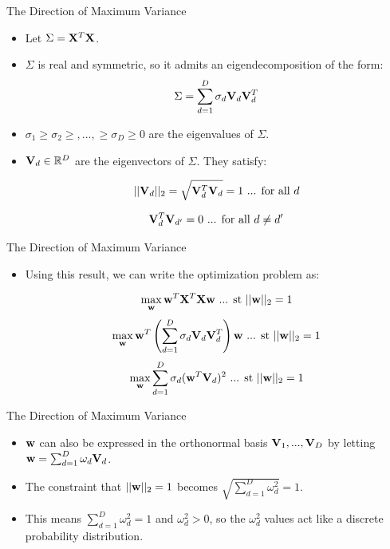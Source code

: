 \documentclass[serif,xcolor=pdftex,dvipsnames,table,hyperref={bookmarks=false,breaklinks}]{beamer}
\begin{document}
\begin{frame}[t]{The Direction of Maximum Variance}

\begin{itemize}
\item Let $\Sigma = {\mathbf{X}}^T{\mathbf{X}}$. 

\pause \item $\Sigma$ is real and symmetric, so it 
admits an eigendecomposition of the form: 
$$\Sigma = \sum_{d=1}^D \sigma_d 
{\mathbf{V}}_d{\mathbf{V}}_d^T$$

\pause \item $\sigma_1\geq \sigma_2 \geq,...,\geq \sigma_D\geq 0$ are the 
eigenvalues of $\Sigma$. 

\pause \item ${\mathbf{V}}_d\in \mathbb{R}^D$ are the eigenvectors of $\Sigma$.
They satisfy: 

$$||{\mathbf{V}}_d||_2 = \sqrt{{\mathbf{V}}_d^T{\mathbf{V}}_d} =1 \mbox{ ... for all } d$$ 

$${\mathbf{V}}_d^T{\mathbf{V}}_{d'} =0 \mbox{ ... for all } d\neq d'$$ 

\end{itemize} 
\end{frame}

\begin{frame}[t]{The Direction of Maximum Variance}

\begin{itemize}
\item Using this result, we can write the optimization problem as:


$$\max_{{\mathbf{w}}} {\mathbf{w}}^T{\mathbf{X}}^T{\mathbf{X}}{\mathbf{w}} \mbox{ ... st } 
||{\mathbf{w}}||_2=1 $$
\pause
$$\max_{{\mathbf{w}}} 
{\mathbf{w}}^T\left(\sum_{d=1}^D \sigma_d {\mathbf{V}}_d{\mathbf{V}}_d^T\right){\mathbf{w}} \mbox{ 
... st } 
||{\mathbf{w}}||_2=1$$
\pause
$$\max_{{\mathbf{w}}} \sum_{d=1}^D \sigma_d 
({\mathbf{w}}^T{\mathbf{V}}_d)^2 \mbox{ ... st } 
||{\mathbf{w}}||_2=1 $$


\end{itemize} 
\end{frame}


\begin{frame}[t]{The Direction of Maximum Variance}

\begin{itemize}
\item ${\mathbf{w}}$ can also be expressed in the orthonormal basis 
${\mathbf{V}}_1,...,{\mathbf{V}}_D$ by letting ${\mathbf{w}} = 
\sum_{d=1}^D\omega_d{\mathbf{V}}_d$. 

\pause\item The constraint that $||{\mathbf{w}}||_2=1 $ becomes $\sqrt{\sum_{d=1}^D 
\omega_d^2}=1$. 

\pause\item This means $\sum_{d=1}^D \omega_d^2=1$ and $\omega_d^2>0$, so the 
$\omega_d^2$ values act like a discrete probability distribution.

\end{itemize} 
\end{frame}
\end{document}
